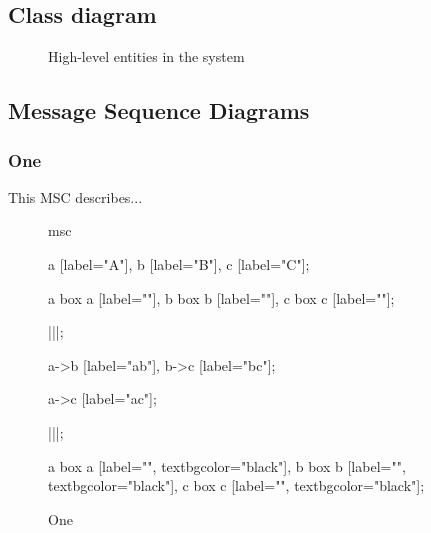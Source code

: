 \subsection{Class diagram}
	\begin{figure}[H]
		\centering
		\caption{High-level entities in the system}
		\label{fig:analysis-model}
	\end{figure}

\subsection{Message Sequence Diagrams}
	\subsubsection{One}
		This MSC describes...
		\begin{figure}[H]
			\centering
			\begin{msc}
				msc
				{

					a [label="A"],
					b [label="B"],
					c [label="C"];

					a box a [label=""],
					b box b [label=""],
					c box c [label=""];

					|||;
					
					a->b [label="ab"],
					b->c [label="bc"];
					
					a->c [label="ac"];

					|||;

					a box a [label="", textbgcolor="black"],
					b box b [label="", textbgcolor="black"],
					c box c [label="", textbgcolor="black"];

				}
			\end{msc}
			\caption{One}
			\label{msc:one}
		\end{figure}